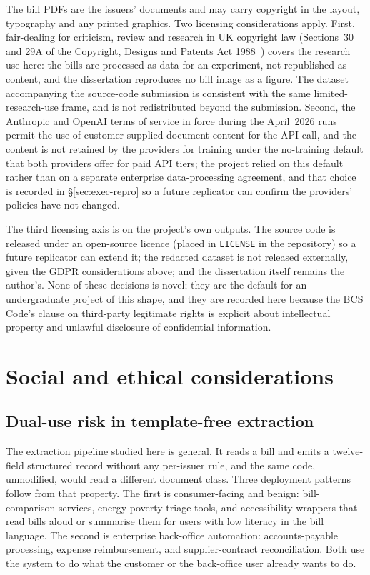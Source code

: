 The bill PDFs are the issuers' documents and may carry copyright in the layout,
typography and any printed graphics. Two licensing considerations apply. First,
fair-dealing for criticism, review and research in UK copyright law (Sections~30
and 29A of the Copyright, Designs and Patents Act 1988~\cite{cdpa1988}) covers the
research use here: the bills are processed as data for an experiment, not
republished as content, and the dissertation reproduces no bill image as a figure.
The dataset accompanying the source-code submission is consistent with the same
limited-research-use frame, and is not redistributed beyond the submission. Second,
the Anthropic and OpenAI terms of service in force during the April~2026 runs
permit the use of customer-supplied document content for the API call, and the
content is not retained by the providers for training under the no-training
default that both providers offer for paid API tiers; the project relied on this
default rather than on a separate enterprise data-processing agreement, and that
choice is recorded in \S\ref{sec:exec-repro} so a future replicator can confirm
the providers' policies have not changed.

The third licensing axis is on the project's own outputs. The source code is
released under an open-source licence (placed in \texttt{LICENSE} in the
repository) so a future replicator can extend it; the redacted dataset is not
released externally, given the GDPR considerations above; and the dissertation
itself remains the author's. None of these decisions is novel; they are the
default for an undergraduate project of this shape, and they are recorded here
because the BCS Code's clause on third-party legitimate rights is explicit about
intellectual property and unlawful disclosure of confidential information.

\section{Social and ethical considerations}
\label{sec:lsesp-social}

\subsection{Dual-use risk in template-free extraction}

The extraction pipeline studied here is general. It reads a bill and emits a
twelve-field structured record without any per-issuer rule, and the same code,
unmodified, would read a different document class. Three deployment patterns
follow from that property. The first is consumer-facing and benign: bill-comparison
services, energy-poverty triage tools, and accessibility wrappers that read bills
aloud or summarise them for users with low literacy in the bill language. The
second is enterprise back-office automation: accounts-payable processing, expense
reimbursement, and supplier-contract reconciliation. Both use the system to do
what the customer or the back-office user already wants to do.

